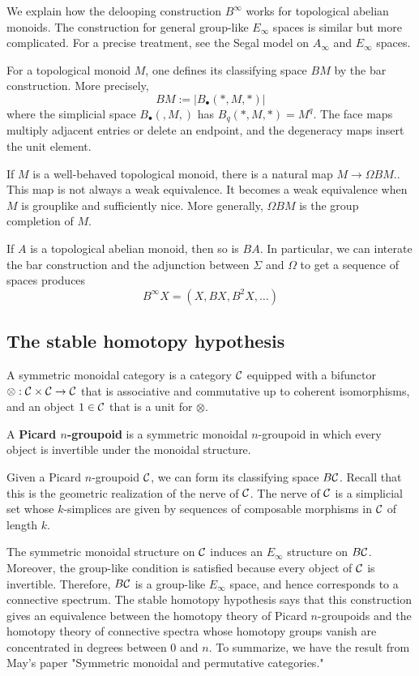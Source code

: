 \documentclass[12pt]{article}
\begin{document}
We explain how the delooping construction $B^\infty$ works for topological abelian monoids. The construction for general group-like $E_\infty$ spaces is similar but more complicated. For a precise treatment, see the Segal model on $A_\infty$ and $E_\infty$ spaces.

For a topological monoid $M$, one defines its classifying space $BM$ by the bar construction. More precisely,
\[BM := |B_\bullet(*,M,*)|\]
where the simplicial space $B_\bullet(,M,)$ has
$B_q(*,M,*)=M^q$. The face maps multiply adjacent entries or delete an endpoint, and the degeneracy maps insert the unit element.

If $M$ is a well-behaved topological monoid, there is a natural map $M\to \Omega BM.$. This map is not always a weak equivalence. It becomes a weak equivalence when $M$ is grouplike and sufficiently nice. More generally, $\Omega BM$ is the group completion of $M$.

If $A$ is a topological abelian monoid, then so is $BA$. In particular, we can interate the bar construction and the adjunction between $\Sigma$ and $\Omega$ to get a sequence of spaces produces \[B^\infty X = (X,BX,B^2X,\dots)\]

\subsection{The stable homotopy hypothesis}
A symmetric monoidal category is a category ${\mathcal{C}}$ equipped with a bifunctor $\otimes:{\mathcal{C}}\times {\mathcal{C}}\to {\mathcal{C}}$ that is associative and commutative up to coherent isomorphisms, and an object $1\in {\mathcal{C}}$ that is a unit for $\otimes$.

\begin{definition}
    A \textbf{Picard $n$-groupoid} is a symmetric monoidal $n$-groupoid in which every object is invertible under the monoidal structure.
\end{definition}

Given a Picard $n$-groupoid ${\mathcal{C}}$, we can form its classifying space $B{\mathcal{C}}$. Recall that this is the geometric realization of the nerve of ${\mathcal{C}}$. The nerve of ${\mathcal{C}}$ is a simplicial set whose $k$-simplices are given by sequences of composable morphisms in ${\mathcal{C}}$ of length $k$.

The symmetric monoidal structure on ${\mathcal{C}}$ induces an $E_\infty$ structure on $B{\mathcal{C}}$. Moreover, the group-like condition is satisfied because every object of ${\mathcal{C}}$ is invertible. Therefore, $B{\mathcal{C}}$ is a group-like $E_\infty$ space, and hence corresponds to a connective spectrum. The stable homotopy hypothesis says that this construction gives an equivalence between the homotopy theory of Picard $n$-groupoids and the homotopy theory of connective spectra whose homotopy groups vanish are concentrated in degrees between $0$ and $n$. To summarize, we have the result from May's paper "Symmetric monoidal and permutative categories."
\end{document}
